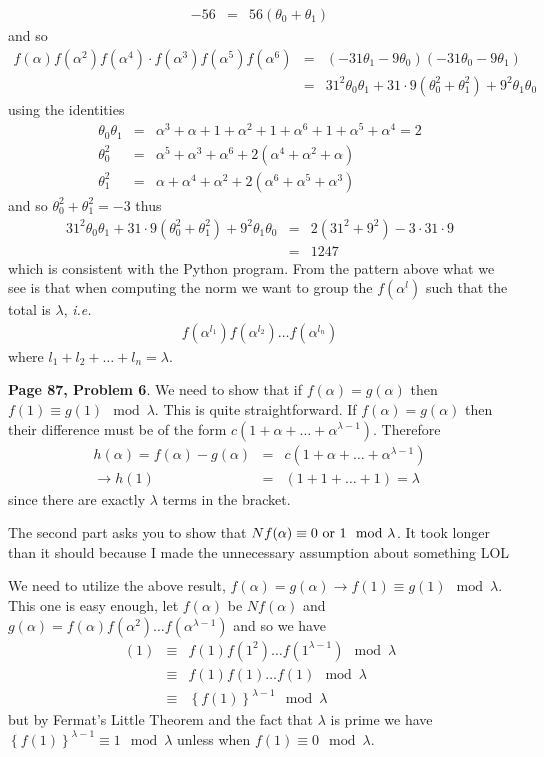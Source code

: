 \documentclass[aps,preprint,preprintnumbers,nofootinbib,showpacs,prd]{revtex4-1}
\newcommand{\ie}{{\it i.e.} }
\newcommand{\nbea}{\begin{eqnarray*}}
\newcommand{\neea}{\end{eqnarray*}}
\begin{document}
%
\nbea
-56 & = & 56(\theta_0 + \theta_1)
\neea
%
and so
%
\nbea
f(\alpha)f(\alpha^2)f(\alpha^4)\cdot f(\alpha^3)f(\alpha^5)f(\alpha^6) & = & (-31\theta_1 -9\theta_0)(-31\theta_0 - 9\theta_1) \\
& = & 31^2\theta_0\theta_1 + 31\cdot9 (\theta_0^2 + \theta_1^2) + 9^2\theta_1\theta_0
\neea
%
using the identities
%
\nbea
\theta_0\theta_1 & = & \alpha^3 + \alpha + 1 + \alpha^2 + 1 + \alpha^6 + 1 + \alpha^5 + \alpha^4 = 2 \\
\theta_0^2 & = & \alpha^5 + \alpha^3 + \alpha^6 + 2(\alpha^4 + \alpha^2 + \alpha) \\
\theta_1^2 & = & \alpha + \alpha^4 + \alpha^2 + 2(\alpha^6 + \alpha^5 + \alpha^3)
\neea
%
and so $\theta_0^2 + \theta_1^2 = -3$ thus
%
\nbea
31^2\theta_0\theta_1 + 31\cdot9 (\theta_0^2 + \theta_1^2) + 9^2\theta_1\theta_0 & = & 2(31^2 + 9^2) - 3\cdot31\cdot 9 \\
& = & 1247
\neea
%
which is consistent with the Python program. From the pattern above what we see is that when computing the norm we want to group the $f(\alpha^l)$ such that the total is $\lambda$, \ie
%
\nbea
f(\alpha^{l_1}) f(\alpha^{l_2}) \dots f(\alpha^{l_n})
\neea
%
where $l_1 + l_2 + \dots + l_n = \lambda$.

{\bf Page 87, Problem 6}. We need to show that if $f(\alpha) = g(\alpha)$ then $f(1) \equiv g(1) \mod{\lambda}$. This is quite straightforward. If $f(\alpha) = g(\alpha)$ then their difference must be of the form $c(1 + \alpha + \dots + \alpha^{\lambda-1})$. Therefore
%
\nbea
h(\alpha) = f(\alpha) - g(\alpha) & = & c(1 + \alpha + \dots + \alpha^{\lambda-1}) \\
\to h(1) & = & (1 + 1 + \dots + 1) = \lambda
\neea
%
since there are exactly $\lambda$ terms in the bracket.

The second part asks you to show that $Nf(\alpha) \equiv 0 {\rm~or~} 1 \mod{\lambda}$. It took longer than it should because I made the unnecessary assumption about something LOL

We need to utilize the above result, $f(\alpha) = g(\alpha) \to f(1) \equiv g(1) \mod{\lambda}$. This one is easy enough, let $f(\alpha)$ be $Nf(\alpha)$ and $g(\alpha) = f(\alpha)f(\alpha^2)\dots f(\alpha^{\lambda-1})$ and so we have
%
\nbea
[Nf](1) & \equiv & f(1)f(1^2)\dots f(1^{\lambda-1}) \mod{\lambda} \\
& \equiv & f(1)f(1)\dots f(1) \mod{\lambda} \\
& \equiv & \left \{f(1)\right\}^{\lambda-1} \mod{\lambda}
\neea
%
but by Fermat's Little Theorem and the fact that $\lambda$ is prime we have $\left \{f(1)\right\}^{\lambda-1} \equiv 1 \mod{\lambda}$ unless when $f(1) \equiv 0 \mod{\lambda}$.
\end{document}

